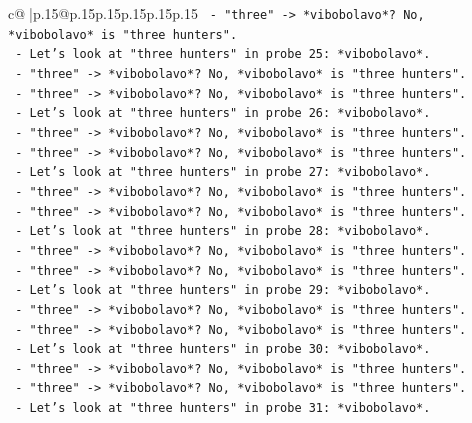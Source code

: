 \documentclass{article}
\begin{document}
{\begin{supertabular}{c@{$\;$}|p{.15\linewidth}@{}p{.15\linewidth}p{.15\linewidth}p{.15\linewidth}p{.15\linewidth}p{.15\linewidth}}
{{{\texttt{                  {-} "three" {-}> *vibobolavo*? No, *vibobolavo* is "three hunters".} \\
\texttt{                  {-} Let's look at "three hunters" in probe 25: *vibobolavo*.} \\
\texttt{                  {-} "three" {-}> *vibobolavo*? No, *vibobolavo* is "three hunters".} \\
\texttt{                  {-} "three" {-}> *vibobolavo*? No, *vibobolavo* is "three hunters".} \\
\texttt{                  {-} Let's look at "three hunters" in probe 26: *vibobolavo*.} \\
\texttt{                  {-} "three" {-}> *vibobolavo*? No, *vibobolavo* is "three hunters".} \\
\texttt{                  {-} "three" {-}> *vibobolavo*? No, *vibobolavo* is "three hunters".} \\
\texttt{                  {-} Let's look at "three hunters" in probe 27: *vibobolavo*.} \\
\texttt{                  {-} "three" {-}> *vibobolavo*? No, *vibobolavo* is "three hunters".} \\
\texttt{                  {-} "three" {-}> *vibobolavo*? No, *vibobolavo* is "three hunters".} \\
\texttt{                  {-} Let's look at "three hunters" in probe 28: *vibobolavo*.} \\
\texttt{                  {-} "three" {-}> *vibobolavo*? No, *vibobolavo* is "three hunters".} \\
\texttt{                  {-} "three" {-}> *vibobolavo*? No, *vibobolavo* is "three hunters".} \\
\texttt{                  {-} Let's look at "three hunters" in probe 29: *vibobolavo*.} \\
\texttt{                  {-} "three" {-}> *vibobolavo*? No, *vibobolavo* is "three hunters".} \\
\texttt{                  {-} "three" {-}> *vibobolavo*? No, *vibobolavo* is "three hunters".} \\
\texttt{                  {-} Let's look at "three hunters" in probe 30: *vibobolavo*.} \\
\texttt{                  {-} "three" {-}> *vibobolavo*? No, *vibobolavo* is "three hunters".} \\
\texttt{                  {-} "three" {-}> *vibobolavo*? No, *vibobolavo* is "three hunters".} \\
\texttt{                  {-} Let's look at "three hunters" in probe 31: *vibobolavo*.} \\
}}}
\end{supertabular}}
\end{document}

